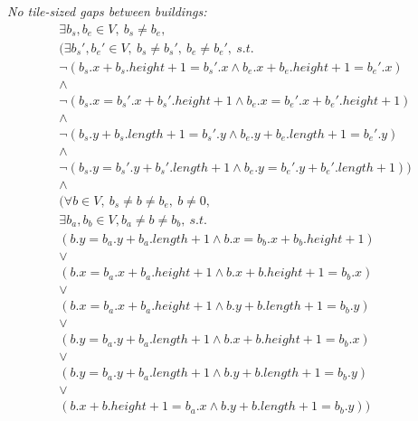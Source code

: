 \documentclass[11pt]{article}
\begin{document}
\noindent
{\em  No tile-sized gaps  between buildings:}
\begin{displaymath}
  \begin{array}{l}
    \exists b_s, b_e \in V,\ b_s \neq b_e,\\
    \Big( \exists b_s', b_e' \in V,\ b_s \neq b_s',\ b_e \neq b_e',\ s.t.\\
    \lnot \left( b_s.x + b_s.height + 1 = b_s'.x \land b_e.x + b_e.height + 1
      = b_e'.x \right)\\
    \land\\
    \lnot \left( b_s.x = b_s'.x +  b_s'.height + 1 \land b_e.x = b_e'.x
      + b_e'.height + 1 \right)\\
    \land\\
    \lnot \left( b_s.y + b_s.length + 1 = b_s'.y \land b_e.y + b_e.length + 1
      = b_e'.y \right)\\
    \land\\
    \lnot \left( b_s.y = b_s'.y +  b_s'.length + 1 \land b_e.y = b_e'.y
      + b_e'.length + 1 \right) \Big)\\
    \land\\
    \Big( \forall b \in V,\ b_s \neq b \neq b_e,\ b \neq 0,\\
    \exists b_a, b_b \in V, b_a \neq b \neq b_b,\ s.t.\\
    \left( b.y = b_a.y + b_a.length + 1 \land b.x = b_b.x +
      b_b.height + 1 \right)\\
    \lor\\
    \left( b.x  = b_a.x + b_a.height  + 1 \land  b.x + b.height +  1 =
      b_b.x \right)\\ 
    \lor\\
    \left( b.x  = b_a.x + b_a.height  + 1 \land  b.y + b.length +  1 =
      b_b.y \right)\\ 
    \lor\\
    \left( b.y  = b_a.y + b_a.length  + 1 \land  b.x + b.height +  1 =
      b_b.x \right)\\ 
    \lor\\
    \left( b.y  = b_a.y + b_a.length  + 1 \land  b.y + b.length +  1 =
      b_b.y \right)\\ 
    \lor\\
    \left( b.x + b.height + 1 = b_a.x \land b.y + b.length + 1 = b_b.y
    \right) \Big) 
  \end{array}
\end{displaymath}
\end{document}
